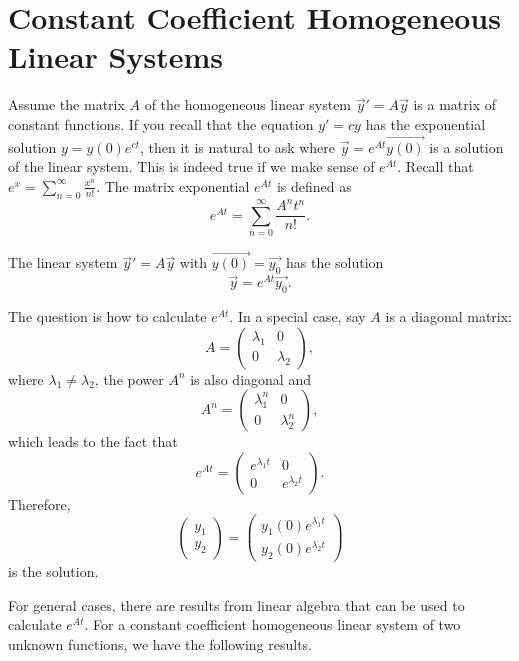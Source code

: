 \section{Constant Coefficient Homogeneous Linear Systems}

Assume the matrix $A$ of the homogeneous linear system $\vec{y}'=A\vec{y}$ is a matrix of constant functions. If you recall that the equation $y'=cy$ has the exponential solution $y=y(0)e^{ct}$, then it is natural to ask where $\vec{y}=e^{At}\vec{y(0)}$ is a solution of the linear system. This is indeed true if we make sense of $e^{At}$. Recall that $e^x=\sum_{n=0}^\infty \frac{x^n}{n!}$. The matrix exponential $e^{At}$ is defined as
\[e^{At}=\sum_{n=0}^\infty \frac{A^nt^n}{n!}.\]

\begin{theorem}
  The linear system $\vec{y}'=A\vec{y}$ with $\vec{y(0)}=\vec{y_0}$ has the solution
  \[\vec{y}=e^{At}\vec{y_0}.\]
\end{theorem}

The question is how to calculate $e^{At}$. In a special case, say $A$ is a diagonal matrix:
\[A=\begin{pmatrix}
  \lambda_1 & 0\\
  0 & \lambda_2
\end{pmatrix},\]
where $\lambda_1\ne\lambda_2$, the power $A^n$ is also diagonal and
\[A^n=\begin{pmatrix}
  \lambda_1^n & 0\\
  0 & \lambda_2^n
\end{pmatrix},\]
which leads to the fact that
\[e^{At}=\begin{pmatrix}
  e^{\lambda_1t} & 0\\
  0 & e^{\lambda_2t}
\end{pmatrix}.\]
Therefore, 
\[
\begin{pmatrix}
  y_1\\ y_2
\end{pmatrix}=
\begin{pmatrix}
  y_1(0) e^{\lambda_1 t}\\ y_2(0) e^{\lambda_2 t}
\end{pmatrix}
\]
is the solution.

For general cases, there are results from linear algebra that can be used to calculate $e^{At}$.
For a constant coefficient homogeneous linear system of two unknown functions, we have the following results.

